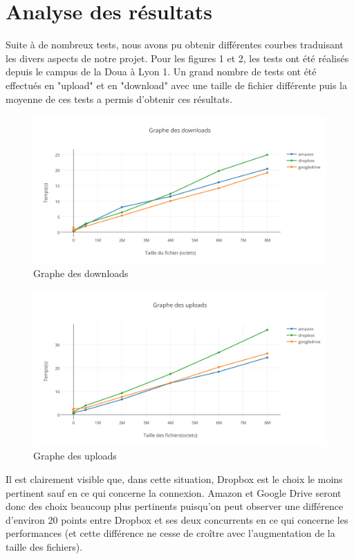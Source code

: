 \documentclass[10pt]{article}
\begin{document}
\section{Analyse des résultats}

Suite à de nombreux tests, nous avons pu obtenir différentes courbes traduisant les divers aspects de notre projet. Pour les figures 1 et 2, les tests ont été réalisés depuis le campus de la Doua à Lyon 1. Un grand nombre de tests ont été effectués en "upload" et en "download" avec une taille de fichier différente puis la moyenne de ces tests a permis d'obtenir ces résultats.

\begin{figure}[h]
\centering
\includegraphics[scale=0.7]{graphe_des_downloads.png}
\caption{Graphe des downloads}
\end{figure}

\newpage

\begin{figure}[h]
\centering
\includegraphics[scale=0.7]{graphe_des_uploads.png}
\caption{Graphe des uploads}
\end{figure}


Il est clairement visible que, dans cette situation, Dropbox est le choix le moins pertinent sauf en ce qui concerne la connexion. Amazon et Google Drive seront donc des choix beaucoup plus pertinents puisqu'on peut observer une différence d'environ 20 points entre Dropbox et ses deux concurrents en ce qui concerne les performances (et cette différence ne cesse de croître avec l'augmentation de la taille des fichiers).\\
\end{document}
